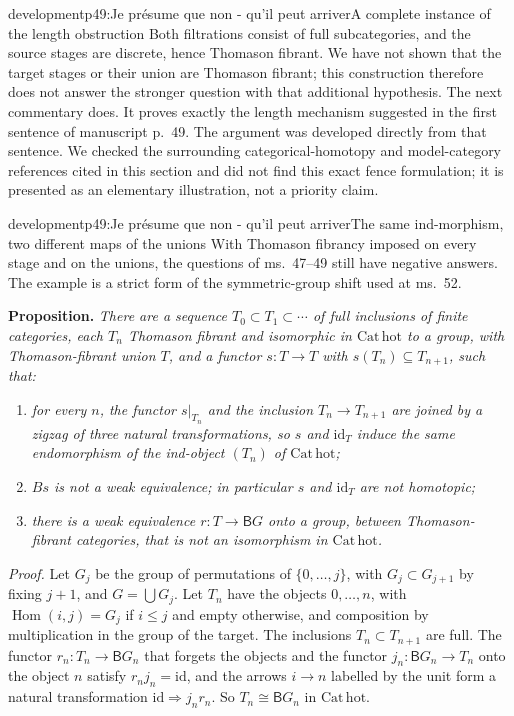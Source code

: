 \begin{dcomment}{development}{p49:Je présume que non - qu'il peut arriver}{A complete instance of the length obstruction}
Both filtrations consist of full subcategories, and the source stages are discrete, hence Thomason fibrant. We have not shown that the target stages or their union are Thomason fibrant; this construction therefore does not answer the stronger question with that additional hypothesis. The next commentary does. It proves exactly the length mechanism suggested in the first sentence of manuscript p.~49. The argument was developed directly from that sentence. We checked the surrounding categorical-homotopy and model-category references cited in this section and did not find this exact fence formulation; it is presented as an elementary illustration, not a priority claim.
\end{dcomment}

\begin{dcomment}{development}{p49:Je présume que non - qu'il peut arriver}{The same ind-morphism, two different maps of the unions}
With Thomason fibrancy imposed on every stage and on the unions, the questions of ms.~47--49 still have negative answers. The example is a strict form of the symmetric-group shift used at ms.~52.

\textbf{Proposition.}\ours
\textit{There are a sequence $T_0\subset T_1\subset\cdots$ of full inclusions of finite categories, each $T_n$ Thomason fibrant and isomorphic in $\mathrm{Cat}\,\mathrm{hot}$ to a group, with Thomason-fibrant union $T$, and a functor $s:T\to T$ with $s(T_n)\subseteq T_{n+1}$, such that:}
\begin{enumerate}[label=(\alph*)]
\item \textit{for every $n$, the functor $s|_{T_n}$ and the inclusion $T_n\to T_{n+1}$ are joined by a zigzag of three natural transformations, so $s$ and $\mathrm{id}_T$ induce the same endomorphism of the ind-object $(T_n)$ of $\mathrm{Cat}\,\mathrm{hot}$;}
\item \textit{$Bs$ is not a weak equivalence; in particular $s$ and $\mathrm{id}_T$ are not homotopic;}
\item \textit{there is a weak equivalence $r:T\to\mathsf BG$ onto a group, between Thomason-fibrant categories, that is not an isomorphism in $\mathrm{Cat}\,\mathrm{hot}$.}
\end{enumerate}

\textit{Proof.}
Let $G_j$ be the group of permutations of $\{0,\dots,j\}$, with $G_j\subset G_{j+1}$ by fixing $j+1$, and $G=\bigcup G_j$. Let $T_n$ have the objects $0,\dots,n$, with $\operatorname{Hom}(i,j)=G_j$ if $i\leq j$ and empty otherwise, and composition by multiplication in the group of the target. The inclusions $T_n\subset T_{n+1}$ are full. The functor $r_n:T_n\to\mathsf BG_n$ that forgets the objects and the functor $j_n:\mathsf BG_n\to T_n$ onto the object $n$ satisfy $r_nj_n=\mathrm{id}$, and the arrows $i\to n$ labelled by the unit form a natural transformation $\mathrm{id}\Rightarrow j_nr_n$. So $T_n\cong\mathsf BG_n$ in $\mathrm{Cat}\,\mathrm{hot}$.


\end{dcomment}
